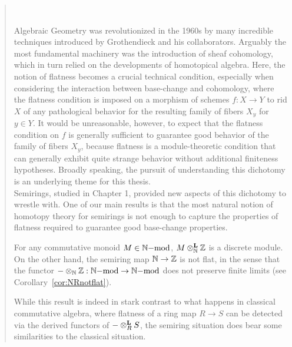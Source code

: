 \renewcommand{\abstractnamefont}{\normalfont}
\renewcommand{\abstractname}{\uppercase{Abstract}}
\begin{abstract}
  \begin{center}
    \thetitle\\
    \theauthor
  \end{center}
  \vspace{1cm}
\pagestyle{empty}

Algebraic Geometry was revolutionized in the 1960s by many incredible techniques introduced by Grothendieck and his collaborators. Arguably 
the most fundamental machinery was the introduction of sheaf cohomology, which in turn relied on the developments of homotopical algebra. 
Here, the notion of flatness becomes a crucial technical condition, especially when considering the interaction between base-change and cohomology, where the flatness condition 
is imposed on a morphism of schemes $f: X \to Y$ to rid $X$ of any pathological behavior for the resulting family of fibers 
$X_y$ for $y \in Y$. It would be unreasonable, however, to expect that the flatness condition on $f$ is generally sufficient to guarantee good behavior of the family of fibers $X_y$, 
because flatness is a module-theoretic condition that can generally exhibit quite strange behavior without additional finiteness hypotheses. Broadly speaking,
the pursuit of understanding this dichotomy is an underlying theme for this thesis.\\
\indent Semirings, studied in Chapter 1, provided new aspects of this dichotomy to wrestle with. One of our main results is that 
the most natural notion of homotopy theory for semirings is not enough to capture the properties of flatness required to guarantee good base-change properties.
\begin{theorem}
For any commutative monoid $M \in \mod{\bb{N}}$, $M \otimesl_{\bb{N}} \bb{Z}$ is a discrete module. On the other hand, 
the semiring map $\bb{N} \to \bb{Z}$ is not flat, in the sense that the functor $-\otimes_{\bb{N}} \bb{Z}:\mod{\bb{N}} \to \mod{\bb{N}}$ does not preserve finite limits (see Corollary~\ref{cor:NRnotflat}).
\end{theorem}
While this result is indeed in stark contrast to what happens in classical commutative algebra, where flatness of a ring map $R \to S$ can be detected via the derived functors of $-\otimesl_R S$, 
the semiring situation does bear some similarities to the classical situation.
\begin{theorem}

\end{theorem}
\end{abstract}
